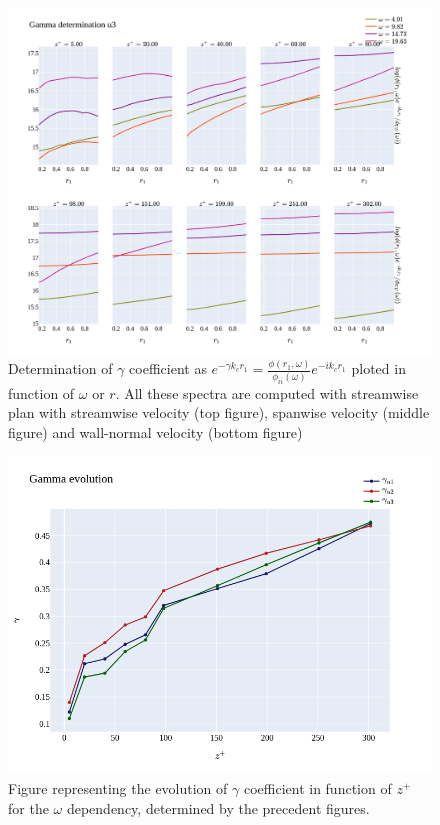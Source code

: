 \documentclass[]{article}
\theoremstyle{plain}
\theoremstyle{remark}
\begin{document}
\begin{figure}[h!]
	\begin{center}
		\includegraphics[width=\textwidth]{../output/channel_wrles_retau395/split_time/gamma/gamma_u3_r_all.png}
		\caption{Determination of $\gamma$ coefficient as $e^{-\gamma k_c r_1} = \frac{\phi(r_1,\omega)}{\phi_{ii}(\omega)}e^{-ik_cr_1}$ ploted in function of $\omega$ or $r$. All these spectra are computed with streamwise plan with streamwise velocity (top figure), spanwise velocity (middle figure) and wall-normal velocity (bottom figure)}
	\end{center}
\end{figure}

\begin{figure}[h!]
	\begin{center}
		\includegraphics[width=\textwidth]{../output/channel_wrles_retau395/split_time/gamma/gamma_view_w_all.png}
		\caption{Figure representing the evolution of $\gamma$ coefficient in function of $z^+$ for the $\omega$ dependency, determined by the precedent figures. }
	\end{center}
\end{figure}
\end{document}
